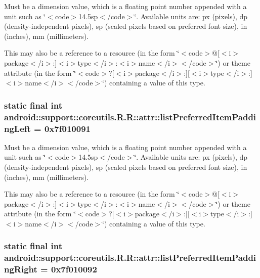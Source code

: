 Must be a dimension value, which is a floating point number appended with a unit such as \char`\"{}$<$code$>$14.5sp$<$/code$>$\char`\"{}. Available units are: px (pixels), dp (density-independent pixels), sp (scaled pixels based on preferred font size), in (inches), mm (millimeters). 

This may also be a reference to a resource (in the form \char`\"{}$<$code$>$@\mbox{[}$<$i$>$package$<$/i$>$:\mbox{]}$<$i$>$type$<$/i$>$:$<$i$>$name$<$/i$>$$<$/code$>$\char`\"{}) or theme attribute (in the form \char`\"{}$<$code$>$?\mbox{[}$<$i$>$package$<$/i$>$:\mbox{]}\mbox{[}$<$i$>$type$<$/i$>$:\mbox{]}$<$i$>$name$<$/i$>$$<$/code$>$\char`\"{}) containing a value of this type. \hypertarget{classandroid_1_1support_1_1coreutils_1_1_r_1_1attr_bba7b4f83740c6a281fb7e6aa52d17e2}{
\subsubsection[{listPreferredItemPaddingLeft}]{\setlength{\rightskip}{0pt plus 5cm}static final int android::support::coreutils.R.R::attr::listPreferredItemPaddingLeft = 0x7f010091}}
\label{classandroid_1_1support_1_1coreutils_1_1_r_1_1attr_bba7b4f83740c6a281fb7e6aa52d17e2}


Must be a dimension value, which is a floating point number appended with a unit such as \char`\"{}$<$code$>$14.5sp$<$/code$>$\char`\"{}. Available units are: px (pixels), dp (density-independent pixels), sp (scaled pixels based on preferred font size), in (inches), mm (millimeters). 

This may also be a reference to a resource (in the form \char`\"{}$<$code$>$@\mbox{[}$<$i$>$package$<$/i$>$:\mbox{]}$<$i$>$type$<$/i$>$:$<$i$>$name$<$/i$>$$<$/code$>$\char`\"{}) or theme attribute (in the form \char`\"{}$<$code$>$?\mbox{[}$<$i$>$package$<$/i$>$:\mbox{]}\mbox{[}$<$i$>$type$<$/i$>$:\mbox{]}$<$i$>$name$<$/i$>$$<$/code$>$\char`\"{}) containing a value of this type. \hypertarget{classandroid_1_1support_1_1coreutils_1_1_r_1_1attr_5089c61d6f3adf5d06d49e97cacab0b2}{
\subsubsection[{listPreferredItemPaddingRight}]{\setlength{\rightskip}{0pt plus 5cm}static final int android::support::coreutils.R.R::attr::listPreferredItemPaddingRight = 0x7f010092}}
\label{classandroid_1_1support_1_1coreutils_1_1_r_1_1attr_5089c61d6f3adf5d06d49e97cacab0b2}


